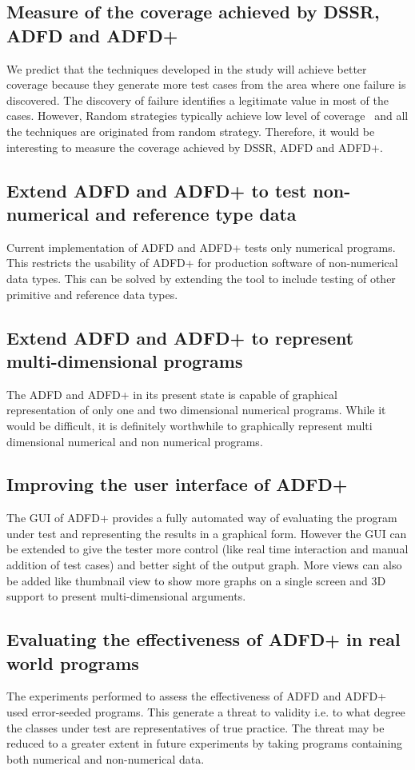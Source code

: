 \subsection{Measure of the coverage achieved by DSSR, ADFD and ADFD+}
We predict that the techniques developed in the study will achieve better coverage because they generate more test cases from the area where one failure is discovered. The discovery of failure identifies a legitimate value in most of the cases. However, Random strategies typically achieve low level of coverage~\cite{oriol2010yeti} and all the techniques are originated from random strategy. Therefore, it would be interesting to measure the coverage achieved by DSSR, ADFD and ADFD+.


\subsection{Extend ADFD and ADFD+ to test non-numerical and reference type data}
Current implementation of ADFD and ADFD+ tests only numerical programs. This restricts the usability of ADFD+ for production software of non-numerical data types. This can be solved by extending the tool to include testing of other primitive and reference data types. 

\subsection{Extend ADFD and ADFD+ to represent multi-dimensional programs}
The ADFD and ADFD+ in its present state is capable of graphical representation of only one and two dimensional numerical programs. While it would be difficult, it is definitely worthwhile to graphically represent multi dimensional numerical and non numerical programs.

\subsection{Improving the user interface of ADFD+}
The GUI of ADFD+ provides a fully automated way of evaluating the program under test and representing the results in a graphical form. However the GUI can be extended to give the tester more control (like real time interaction and manual addition of test cases) and better sight of the output graph. More views can also be added like thumbnail view to show more graphs on a single screen and 3D support to present multi-dimensional arguments.

\subsection{Evaluating the effectiveness of ADFD+ in real world programs}
The experiments performed to assess the effectiveness of ADFD and ADFD+ used error-seeded programs. This generate a threat to validity i.e. to what degree the classes under test are representatives of true practice. The threat may be reduced to a greater extent in future experiments by taking programs containing both numerical and non-numerical data.  

